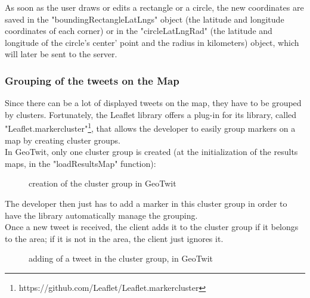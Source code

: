 \documentclass[a4paper,11pt]{report}
\begin{document}
As soon as the user draws or edits a rectangle or a circle, the new coordinates are saved in the "boundingRectangleLatLngs" object (the latitude and longitude coordinates of each corner) or in the "circleLatLngRad" (the latitude and longitude of the circle's center' point and the radius in kilometers) object, which will later be sent to the server.
\bigskip

\subsubsection{Grouping of the tweets on the Map}
Since there can be a lot of displayed tweets on the map, they have to be grouped by clusters. Fortunately, the Leaflet library offers a plug-in for its library, called "Leaflet.markercluster"\footnote{https://github.com/Leaflet/Leaflet.markercluster}, that allows the developer to easily group markers on a map by creating cluster groups.\\

In GeoTwit, only one cluster group is created (at the initialization of the results maps, in the "loadResultsMap" function):
\begin{figure}[H]
\vspace{-5pt}
\begin{center}
\vspace{-20pt}
\caption{creation of the cluster group in GeoTwit}
\end{center}
\end{figure}

The developer then just has to add a marker in this cluster group in order to have the library automatically manage the grouping.\\

Once a new tweet is received, the client adds it to the cluster group if it belongs to the area; if it is not in the area, the client just ignores it.
\begin{figure}[H]
\vspace{-5pt}
\begin{center}
\vspace{-20pt}
\caption{adding of a tweet in the cluster group, in GeoTwit}
\end{center}
\end{figure}
\end{document}
